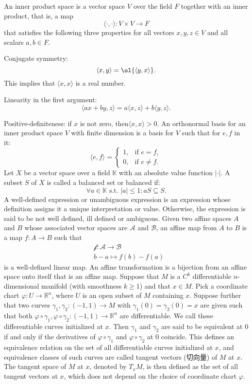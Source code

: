 \documentclass[a4paper,12pt]{article}
\begin{document}
An inner product space is a vector space $V$ over the field $F$ together with an inner product, that is, a map
\[\langle \cdot ,\cdot \rangle \colon V\times V\to F\]
that satisfies the following three properties for all vectors $x,y,z\in V$ and all scalars $a,b\in F$.
\bit
\item Conjugate symmetry: 
\[\langle x,y\rangle =\ol{\langle y,x\rangle }.\]
This implies that $\langle x,x\rangle$ is a real number.
\item Linearity in the first argument:
\[ \langle ax+by,z\rangle =a\langle x,z\rangle +b\langle y,z\rangle .\]
\item Positive-definiteness: if $x$ is not zero, then$\langle x,x\rangle >0$.
\eit
{}
An orthonormal basis for an inner product space $V$ with finite dimension is a basis for $V$ such that for $e,f$ in it:
\[\langle e,f \rangle = \begin{cases}1, & \text{if } e=f,\\0, & \text{if } e\neq f.\end{cases}\]
Let $X$ be a vector space over a field $\mathbb{K}$ with an absolute value function $|\cdot |$. A subset $S$ of $X$ is called a balanced set or balanced if:
\[\forall a\in\mathbb{K}\text{ s.t. }|a|\leq 1\colon aS\subseteq S.\]
A well-defined expression or unambiguous expression is an expression whose definition assigns it a unique interpretation or value. Otherwise, the expression is said to be not well defined, ill defined or ambiguous.
Given two affine spaces $A$ and $B$ whose associated vector spaces are $\mathscr{A}$ and $\mathscr{B}$, an affine map from $A$ to $B$ is a map $f\colon A\to B$ such that
\[\begin{aligned}
&\mathscr{f}\colon\mathscr{A}\to\mathscr{B}\\
&b-a\mapsto f(b)-f(a)
\end{aligned}\]
is a well-defined linear map.
An affine transformation is a bijection from an affine space onto itself that is an affine map.
Suppose that $M$ is a $C^k$ differentiable $n$-dimensional manifold (with smoothness $k\geq 1$) and that $x\in M$. Pick a coordinate chart $\varphi\colon U\to\mathbb{R}^n$, where $U$ is an open subset of $M$ containing $x$. Suppose further that two curves $\gamma_1,\gamma_2\colon (-1,1)\to M$ with $\gamma_1(0)=\gamma_2(0)=x$ are given such that both $\varphi\circ\gamma_1,\varphi\circ\gamma_2\colon (-1,1)\to\mathbb{R}^n$ are differentiable. We call these differentiable curves initialized at $x$. Then $\gamma_1$ and $\gamma_2$ are said to be equivalent at $0$ if and only if the derivatives of $\varphi\circ\gamma_1$ and $\varphi\circ\gamma_2$ at $0$ coincide. This defines an equivalence relation on the set of all differentiable curves initialized at $x$, and equivalence classes of such curves are called tangent vectors (切向量) of $M$ at $x$. The tangent space of $M$ at $x$, denoted by $T_xM$, is then defined as the set of all tangent vectors at $x$, which does not depend on the choice of coordinate chart $\varphi$.
\end{document}
